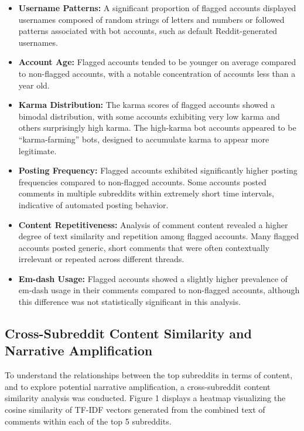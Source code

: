 \documentclass[
  12pt,
  letterpaper,
  DIV=11,
  numbers=noendperiod]{scrartcl}
\begin{document}
\begin{itemize}
\item
  \textbf{Username Patterns:} A significant proportion of flagged
  accounts displayed usernames composed of random strings of letters and
  numbers or followed patterns associated with bot accounts, such as
  default Reddit-generated usernames.
\item
  \textbf{Account Age:} Flagged accounts tended to be younger on average
  compared to non-flagged accounts, with a notable concentration of
  accounts less than a year old.
\item
  \textbf{Karma Distribution:} The karma scores of flagged accounts
  showed a bimodal distribution, with some accounts exhibiting very low
  karma and others surprisingly high karma. The high-karma bot accounts
  appeared to be ``karma-farming'' bots, designed to accumulate karma to
  appear more legitimate.
\item
  \textbf{Posting Frequency:} Flagged accounts exhibited significantly
  higher posting frequencies compared to non-flagged accounts. Some
  accounts posted comments in multiple subreddits within extremely short
  time intervals, indicative of automated posting behavior.
\item
  \textbf{Content Repetitiveness:} Analysis of comment content revealed
  a higher degree of text similarity and repetition among flagged
  accounts. Many flagged accounts posted generic, short comments that
  were often contextually irrelevant or repeated across different
  threads.
\item
  \textbf{Em-dash Usage:} Flagged accounts showed a slightly higher
  prevalence of em-dash usage in their comments compared to non-flagged
  accounts, although this difference was not statistically significant
  in this analysis.
\end{itemize}

\subsection{Cross-Subreddit Content Similarity and Narrative
Amplification}\label{cross-subreddit-content-similarity-and-narrative-amplification}

To understand the relationships between the top subreddits in terms of
content, and to explore potential narrative amplification, a
cross-subreddit content similarity analysis was conducted. Figure 1
displays a heatmap visualizing the cosine similarity of TF-IDF vectors
generated from the combined text of comments within each of the top 5
subreddits.
\end{document}
